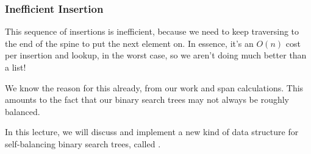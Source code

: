 \documentclass[aspectratio=169, handout]{beamer}
\begin{document}
\begin{frame}[fragile]
\begin{center}
  \begin{minipage}{0.15\textwidth}
    \begin{center}
    \end{center}
  \end{minipage}
  \end{center}
\end{frame}

\begin{frame}[fragile]
  \frametitle{Inefficient Insertion}

  This sequence of insertions is inefficient, because we need to keep traversing
  to the end of the spine to put the next element on. In essence, it's an
  $O(n)$ cost per insertion and lookup, in the worst case, so we aren't doing
  much better than a list!

  \pause
  \vspace{\fill}

  We know the reason for this already, from our work and span calculations. This
  amounts to the fact that our binary search trees may not always be roughly
  balanced.

  \pause
  \vspace{\fill}

  In this lecture, we will discuss and implement a new kind of data structure
  for self-balancing binary search trees, called .
\end{frame}
\end{document}
